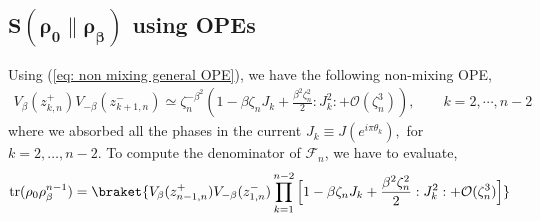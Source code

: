 \documentclass[11pt]{article}
\newcommand{\mO}{\mathcal{O}}
\newcommand{\nn}{\nonumber}
\newcommand{\lb}{\left(}
\newcommand{\rb}{\right)}
\begin{document}
\subsection{\texorpdfstring{$\boldsymbol{S(\rho_0 \| \rho_\beta)}$ using OPEs}{S(rho 0 rho beta) using OPEs}}
Using (\ref{eq: non mixing general OPE}), we have the following non-mixing OPE,
\begin{align}
    V_{\beta}(z_{k,n}^+)V_{-\beta}(z_{k+1,n}^-) \simeq \zeta_n^{-\beta^2}\lb 1-\beta \zeta_n J_k + \frac{\beta^2\zeta_n^2}{2}:J_k^2: + \mO(\zeta_n^3)  \rb, \qquad k = 2,\cdots, n-2
\end{align}
where we absorbed all the phases in the current $J_k \equiv J(e^{i\pi\theta_k}),$ for $k=2,\ldots,n-2$.
To compute the denominator of $\mathcal{F}_n$, we have to evaluate,
\begin{align}
     \text{tr}(\rho_0\rho_\beta^{n-1}) = \braket{V_\beta(z_{n-1,n}^+)V_{-\beta}(z_{1,n}^-) \prod_{k=1}^{n-2} \Big[ 1 - \beta \zeta_n J_k + \frac{\beta^2 \zeta_n^2}{2} : J^2_k: + \mO(\zeta_n^3)\Big] } 
\end{align}
\end{document}
